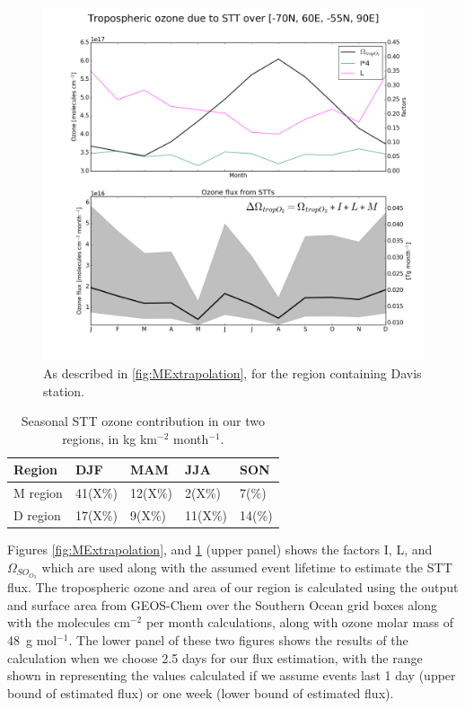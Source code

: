 \documentclass[acp, manuscript]{copernicus} %
\begin{document}
    \begin{figure}
      \includegraphics[width=12.0cm]{figures/STT_extrapolation_Dav_B.png}
      \caption{%
	As described in \ref{fig:MExtrapolation}, for the region containing Davis station.}
      \label{fig:DExtrapolation}
    \end{figure}
    
    \begin{table}[t]
      \captionsetup{justification=centering}
      \caption{Seasonal STT ozone contribution in our two regions, in kg km$^{-2}$ month$^{-1}$.}
      \begin{tabular}{ l l l l l } 
	\hline
	Region & DJF & MAM & JJA & SON \\
	\hline
	M region & 41(X\%) & 12(X\%) &  2(X\%) &  7(\%) \\ 
	D region & 17(X\%) &  9(X\%) & 11(X\%) & 14(\%) \\
	\hline
      \end{tabular}
      \label{table:extrapolationResults}
    \end{table}
    
    Figures \ref{fig:MExtrapolation}, and \ref{fig:DExtrapolation} (upper panel) shows the factors I, L, and $\Omega_{SO_{O_3}}$ which are used along with the assumed event lifetime to estimate the STT flux.
    The tropospheric ozone and area of our region is calculated using the output and surface area from GEOS-Chem over the Southern Ocean grid boxes along with the molecules cm$^{-2}$ per month calculations, along with ozone molar mass of 48~g mol$^{-1}$.
    The lower panel of these two figures shows the results of the calculation when we choose 2.5 days for our flux estimation, with the range shown in representing the values calculated if we assume events last 1 day (upper bound of estimated flux) or one week (lower bound of estimated flux).
  
\end{document}
